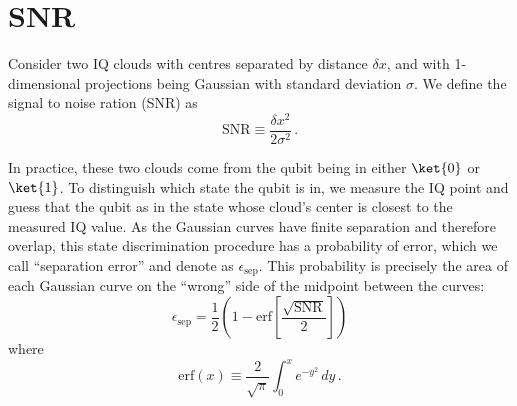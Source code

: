 \documentclass[twocolumn]{article}
\begin{document}
\section{SNR}

Consider two IQ clouds with centres separated by distance $\delta x$, and with 1-dimensional projections being Gaussian with standard deviation $\sigma$.
We define the signal to noise ration (SNR) as
\begin{equation}
\text{SNR} \equiv \frac{\delta x^2}{2 \sigma^2} \, .
\end{equation}

In practice, these two clouds come from the qubit being in either $\ket{0}$ or $\ket{1}$.
To distinguish which state the qubit is in, we measure the IQ point and guess that the qubit as in the state whose cloud's center is closest to the measured IQ value.
As the Gaussian curves have finite separation and therefore overlap, this state discrimination procedure has a probability of error, which we call ``separation error'' and denote as $\epsilon_\text{sep}$.
This probability is precisely the area of each Gaussian curve on the ``wrong'' side of the midpoint between the curves:
\begin{equation}
\epsilon_{\text{sep}} = \frac{1}{2} \left( 1 - \text{erf} \left[ \frac{\sqrt{\text{SNR}}}{2} \right] \right)
\end{equation}
where \begin{equation}
\text{erf}(x)\equiv \frac{2}{\sqrt{\pi}} \int_0^x e^{-y^2}\, dy \, .
\end{equation}
\end{document}
